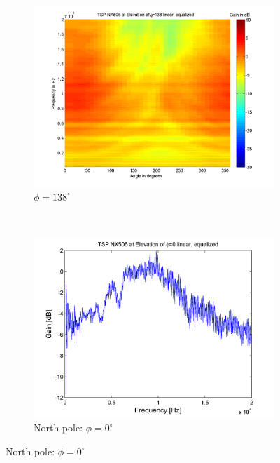 \begin{figure}[t!]
        \begin{subfigure}[t]{0.5\textwidth}
			    \caption{$\phi=138^\circ$}
			    \label{fig:res_NX506_pluis_138}
                \centering
    			\includegraphics[height=0.28\textheight]{afbeeldingen/plots/results/NX506_TSP_138_lin_eq.png}
        \end{subfigure}~
        \begin{subfigure}[t]{0.5\textwidth}
			    \caption{North pole: $\phi=0^\circ$}
			    \label{fig:res_NX506_pluis_0}
                \centering
    			\includegraphics[height=0.28\textheight]{afbeeldingen/plots/results/NX506_north.png}
        \end{subfigure}
        

\end{figure}
